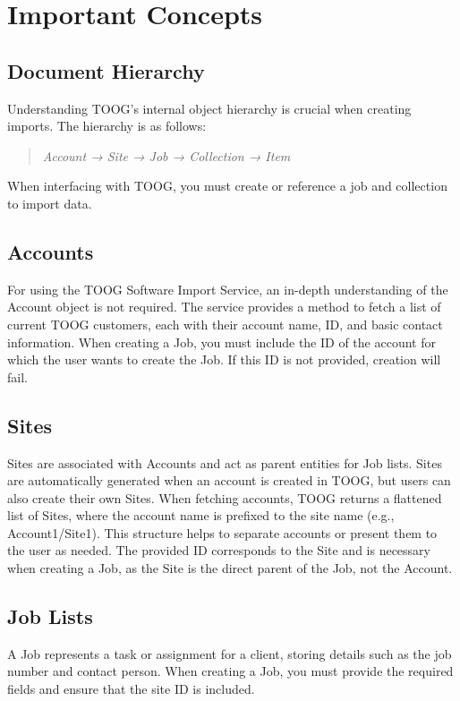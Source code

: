 \documentclass{memoir}
\begin{document}
	\section{Important Concepts}
	
	\subsection{Document Hierarchy}
	Understanding TOOG's internal object hierarchy is crucial when creating imports. The hierarchy is as follows:
	\begin{quote}
		\textit{Account → Site → Job → Collection → Item}
	\end{quote}
	When interfacing with TOOG, you must create or reference a job and collection to import data.
	
	\subsection{Accounts}
	For using the TOOG Software Import Service, an in-depth understanding of the Account object is not required. The service provides a method to fetch a list of current TOOG customers, each with their account name, ID, and basic contact information. When creating a Job, you must include the ID of the account for which the user wants to create the Job. If this ID is not provided, creation will fail.
	
	\subsection{Sites}
	Sites are associated with Accounts and act as parent entities for Job lists. Sites are automatically generated when an account is created in TOOG, but users can also create their own Sites. When fetching accounts, TOOG returns a flattened list of Sites, where the account name is prefixed to the site name (e.g., Account1/Site1). This structure helps to separate accounts or present them to the user as needed. The provided ID corresponds to the Site and is necessary when creating a Job, as the Site is the direct parent of the Job, not the Account.
	
	\subsection{Job Lists}
	A Job represents a task or assignment for a client, storing details such as the job number and contact person. When creating a Job, you must provide the required fields and ensure that the site ID is included.
	
\end{document}
